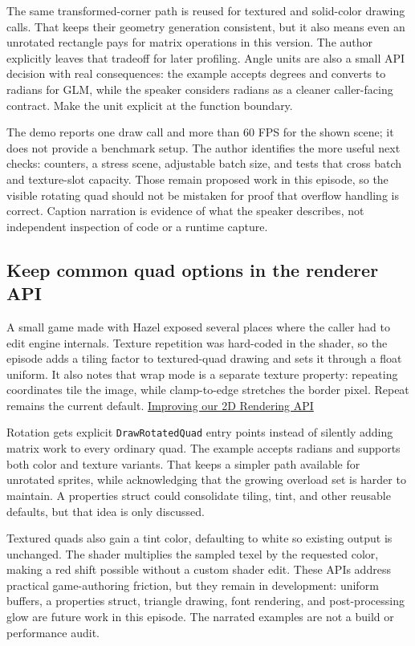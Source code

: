 The same transformed-corner path is reused for textured and solid-color drawing calls. That keeps their geometry generation consistent, but it also means even an unrotated rectangle pays for matrix operations in this version. The author explicitly leaves that tradeoff for later profiling. Angle units are also a small API decision with real consequences: the example accepts degrees and converts to radians for GLM, while the speaker considers radians as a cleaner caller-facing contract. Make the unit explicit at the function boundary.

The demo reports one draw call and more than 60 FPS for the shown scene; it does not provide a benchmark setup. The author identifies the more useful next checks: counters, a stress scene, adjustable batch size, and tests that cross batch and texture-slot capacity. Those remain proposed work in this episode, so the visible rotating quad should not be mistaken for proof that overflow handling is correct. Caption narration is evidence of what the speaker describes, not independent inspection of code or a runtime capture.

\subsection{Keep common quad options in the renderer API}\label{06-engine-ii-ch026-keep-common-quad-options-in-the-renderer-api}

A small game made with Hazel exposed several places where the caller had to edit engine internals. Texture repetition was hard-coded in the shader, so the episode adds a tiling factor to textured-quad drawing and sets it through a float uniform. It also notes that wrap mode is a separate texture property: repeating coordinates tile the image, while clamp-to-edge stretches the border pixel. Repeat remains the current default. \href{https://www.youtube.com/watch?v=Q86V5DnSPPs}{Improving our 2D Rendering API}

Rotation gets explicit \texttt{DrawRotatedQuad} entry points instead of silently adding matrix work to every ordinary quad. The example accepts radians and supports both color and texture variants. That keeps a simpler path available for unrotated sprites, while acknowledging that the growing overload set is harder to maintain. A properties struct could consolidate tiling, tint, and other reusable defaults, but that idea is only discussed.

Textured quads also gain a tint color, defaulting to white so existing output is unchanged. The shader multiplies the sampled texel by the requested color, making a red shift possible without a custom shader edit. These APIs address practical game-authoring friction, but they remain in development: uniform buffers, a properties struct, triangle drawing, font rendering, and post-processing glow are future work in this episode. The narrated examples are not a build or performance audit.

